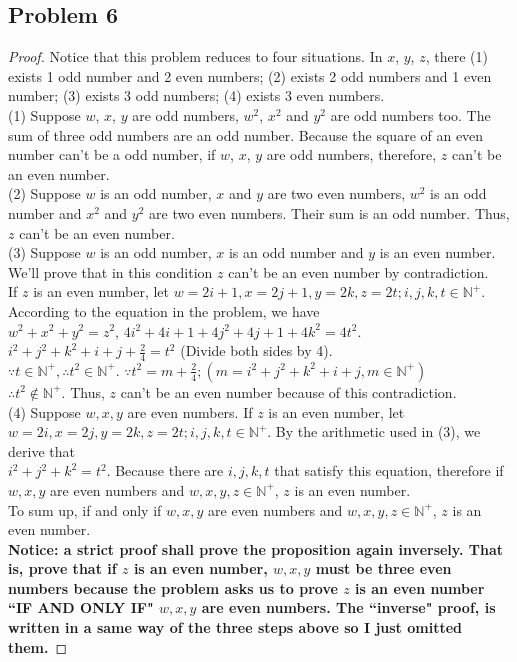 \documentclass{article}
\begin{document}
\subsection{Problem 6}
\begin{proof}
Notice that this problem reduces to four situations. In $x$, $y$, $z$, there (1) exists 1 odd number and 2 even numbers; (2) exists 2 odd numbers and 1 even number; (3) exists 3 odd numbers; (4) exists 3 even numbers.
\\ (1) Suppose $w$, $x$, $y$ are odd numbers, $w^2$, $x^2$ and $y^2$ are odd numbers too. The sum of three odd numbers are an odd number. Because the square of an even number can't be a odd number, if $w$, $x$, $y$ are odd numbers, therefore, $z$ can't be an even number.
\\ (2) Suppose $w$ is an odd number, $x$ and $y$ are two even numbers, $w^2$ is an odd number and $x^2$ and $y^2$ are two even numbers. Their sum is an odd number. Thus, $z$ can't be an even number.
\\ (3) Suppose $w$ is an odd number, $x$ is an odd number and $y$ is an even number. We'll prove that in this condition $z$ can't be an even number by contradiction.
\\ If $z$ is an even number, let $w = 2i + 1, x = 2j + 1, y = 2k, z = 2t; i,j,k,t \in \mathbb{N}^+$.
\\ According to the equation in the problem, we have
\\ $w^2 + x^2 + y^2 = z^2$, $4i^2 + 4i + 1 + 4j^2 + 4j + 1 + 4k^2 = 4t^2$.
\\ $i^2 + j^2 + k^2 + i + j + \frac{2}{4} = t^2$ (Divide both sides by 4).
\\ $\because t \in \mathbb{N}^+, \therefore t^2 \in \mathbb{N}^+$. $\because t^2 = m + \frac{2}{4}; (m = i^2 + j^2 + k^2 + i + j, m \in \mathbb{N}^+)$
\\ $\therefore t^2 \notin \mathbb{N}^+$. Thus, $z$ can't be an even number because of this contradiction. 
\\ (4) Suppose $w,x,y$ are even numbers. If $z$ is an even number, let $w=2i, x=2j, y=2k, z=2t; i,j,k,t \in \mathbb{N}^+$. By the arithmetic used in (3), we derive that 
\\ $i^2 + j^2 + k^2 = t^2$. Because there are $i,j,k,t$ that satisfy this equation, therefore if $w,x,y$ are even numbers and $w,x,y,z \in \mathbb{N}^+$, $z$ is an even number.
\\ To sum up, if and only if $w,x,y$ are even numbers and $w,x,y,z \in \mathbb{N}^+$, $z$ is an even number.
\\ \textbf{Notice: a strict proof shall prove the proposition again inversely. That is, prove that if $z$ is an even number, $w,x,y$ must be three even numbers because the problem asks us to prove $z$ is an even number ``IF AND ONLY IF" $w,x,y$ are even numbers. The ``inverse" proof, is written in a same way of the three steps above so I just omitted them.}
\end{proof}
\end{document}
